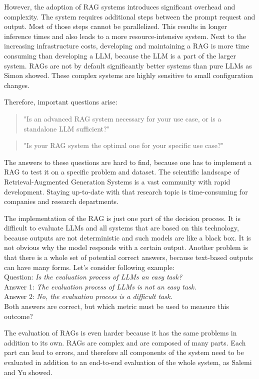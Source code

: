 However, the adoption of RAG systems introduces significant overhead and complexity. The system requires additional steps between the prompt request and output. Most of those steps cannot be parallelized. This results in longer inference times and also leads to a more resource-intensive system. Next to the increasing infrastructure costs, developing and maintaining a RAG is more time consuming than developing a LLM, because the LLM is a part of the larger system. RAGs are not by default significantly better systems than pure LLMs as Simon \cite{Simon.10112024} showed. These complex systems are highly sensitive to small configuration changes.

Therefore, important questions arise:
\begin{quotation}
    "Is an advanced RAG system necessary for your use case, or is a standalone LLM sufficient?"
\end{quotation}
\begin{quotation}
    "Is your RAG system the optimal one for your specific use case?"
\end{quotation}

The answers to these questions are hard to find, because one has to implement a RAG to test it on a specific problem and dataset. The scientific landscape of Retrieval-Augmented Generation Systems is a vast community with rapid development. Staying up-to-date with that research topic is time-consuming for companies and research departments. 

The implementation of the RAG is just one part of the decision process. It is difficult to evaluate LLMs and all systems that are based on this technology, because outputs are not deterministic and such models are like a black box. It is not obvious why the model responds with a certain output. Another problem is that there is a whole set of potential correct answers, because text-based outputs can have many forms. Let's consider following example:\\

Question: \textit{Is the evaluation process of LLMs an easy task?}\\
Answer 1: \textit{The evaluation process of LLMs is not an easy task.}\\
Answer 2: \textit{No, the evaluation process is a difficult task.}\\[6pt]

Both answers are correct, but which metric must be used to measure this outcome? 

The evaluation of RAGs is even harder because it has the same problems in addition to its own. RAGs are complex and are composed of many parts. Each part can lead to errors, and therefore all components of the system need to be evaluated in addition to an end-to-end evaluation of the whole system, as Salemi \cite{Salemi.2024} and Yu \cite{Yu.2024} showed.

